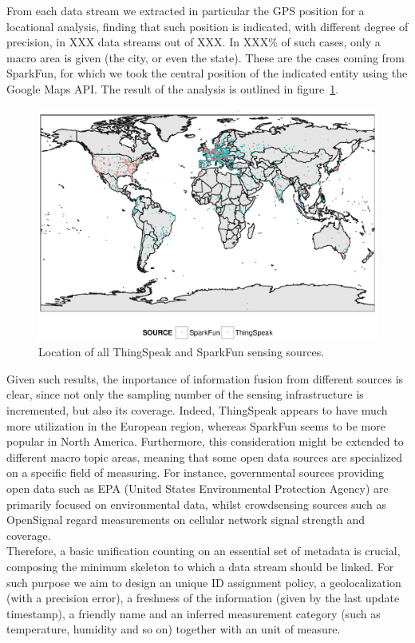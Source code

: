 \documentclass[conference]{IEEEtran}
\begin{document}
From each data stream we extracted in particular the GPS position for a locational analysis, finding that such position is indicated, with different degree of precision, in XXX data streams out of XXX.
In XXX\% of such cases, only a macro area is given (the city, or even the state).
These are the cases coming from SparkFun, for which we took the central position of the indicated entity using the Google Maps API.
The result of the analysis is outlined in figure~\ref{geo}.

\begin{figure}[!t]
\centering
\includegraphics[width=1\textwidth]{img/map.eps} 
\caption{Location of all ThingSpeak and SparkFun sensing sources.}
\label{geo}
\end{figure}

Given such results, the importance of information fusion from different sources is clear, since not only the sampling number of the sensing infrastructure is incremented, but also its coverage.
Indeed, ThingSpeak appears to have much more utilization in the European region, whereas SparkFun seems to be more popular in North America.
Furthermore, this consideration might be extended to different macro topic areas, meaning that some open data sources are specialized on a specific field of measuring.
For instance, governmental sources providing open data such as EPA (United States Environmental Protection Agency) \cite{epa} are primarily focused on environmental data, whilst crowdsensing sources such as OpenSignal \cite{opensignal} regard measurements on cellular network signal strength and coverage.
\\

Therefore, a basic unification counting on an essential set of metadata is crucial, composing the minimum skeleton to which a data stream should be linked.
For such purpose we aim to design an unique ID assignment policy, a geolocalization (with a precision error), a freshness of the information (given by the last update timestamp), a friendly name and an inferred measurement category (such as temperature, humidity and so on) together with an unit of measure.
\end{document}

